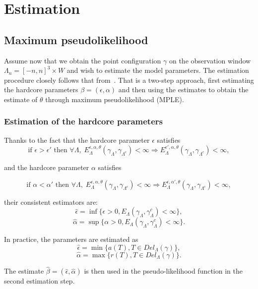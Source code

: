 \chapter{Estimation}
\section{Maximum pseudolikelihood}
Assume now that we obtain the point configuration $\gamma$ on the observation window $\Lambda_n = [-n,n]^3\times W$ and wish to estimate the model parameters.
The estimation procedure closely follows that from~\cite{DL10}. That is a two-step approach, first estimating the hardcore parameters $\beta = (\epsilon,\alpha)$ and then using the estimates to obtain the estimate of $\theta$ through maximum pseudolikelihood (MPLE). 
\subsection{Estimation of the hardcore parameters}
Thanks to the fact that the hardcore parameter $\epsilon$ satisfies
$$ \text{if } \epsilon > \epsilon' \text{ then  } \forall \Lambda, \; E^{\epsilon, \alpha,\theta}_\Lambda(\gamma_\Lambda,\gamma_{\Lambda^c}) < \infty \Rightarrow  E^{\epsilon',\alpha,\theta}_\Lambda(\gamma_\Lambda,\gamma_{\Lambda^c})<\infty,$$ 

and the hardcore parameter $\alpha$ satisfies

$$ \text{if } \alpha < \alpha' \text{ then  } \forall \Lambda, \; E^{\epsilon,\alpha,\theta}_\Lambda(\gamma_\Lambda,\gamma_{\Lambda^c}) < \infty \Rightarrow  E^{\epsilon,\alpha',\theta}_\Lambda(\gamma_\Lambda,\gamma_{\Lambda^c})<\infty,$$ 

their consistent estimators are:
$$\hat\epsilon = \inf\{\epsilon > 0, E_\Lambda(\gamma_\Lambda, \gamma_\Lambda^c) < \infty \},$$
$$\hat\alpha = \sup\{\alpha > 0, E_\Lambda(\gamma_\Lambda, \gamma_\Lambda^c) < \infty \}.$$

In practice, the parameters are estimated as
$$\hat\epsilon = \min\{a(T), T\in Del_\Lambda(\gamma)\},$$
$$\hat\alpha = \max\{r(T), T\in Del_\Lambda(\gamma)\}.$$

The estimate $\hat\beta = (\hat\epsilon,\hat\alpha)$ is then used in the pseudo-likelihood function in the second estimation step.


